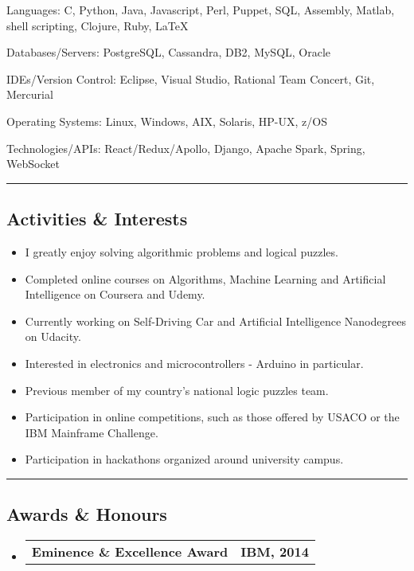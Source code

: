 \documentclass[10pt,letterpaper]{article}
\makeatletter
\newenvironment{indentsection}[1]%
{\begin{list}{}%
    {\setlength{\leftmargin}{#1}}%
    \item[]%
}
{\end{list}}
\newcommand{\headerrow}[2]
{\begin{tabular*}{\linewidth}{l@{\extracolsep{\fill}}r}
    #1 &
    #2 \\
\end{tabular*}}
\makeatother
\begin{document}
\begin{indentsection}{\parindent}
\begin{description*}
    \item[Languages:]
    C, Python, Java, Javascript, Perl, Puppet, SQL, Assembly, Matlab, shell scripting, Clojure, Ruby, \LaTeX
    \item[Databases/Servers:]
    PostgreSQL, Cassandra, DB2, MySQL, Oracle
    \item[IDEs/Version Control:]
    Eclipse, Visual Studio, Rational Team Concert, Git, Mercurial
    \item[Operating Systems:]
    Linux, Windows, AIX, Solaris, HP-UX, z/OS
    \item[Technologies/APIs:] React/Redux/Apollo, Django, Apache Spark, Spring, WebSocket

\end{description*}
\end{indentsection}

\hrule
\vspace{-0.4em}
\subsection*{Activities \& Interests}

\begin{itemize}
    \parskip=0.1em

    \item I greatly enjoy solving algorithmic problems and logical puzzles.
    \item Completed online courses on Algorithms, Machine Learning and Artificial Intelligence on Coursera and Udemy.
    \item Currently working on Self-Driving Car and Artificial Intelligence Nanodegrees on Udacity.
    \item Interested in electronics and microcontrollers - Arduino in particular.
    \item Previous member of my country's national logic puzzles team.
    \item Participation in online competitions, such as those offered by USACO or the IBM Mainframe Challenge.
    \item Participation in hackathons organized around university campus.

\end{itemize}

\hrule
\vspace{-0.4em}
\subsection*{Awards \& Honours}

\begin{itemize}
    \parskip=0.1em
    \item
    \headerrow
        {\textbf{Eminence \& Excellence Award}}
        {\textbf{IBM, 2014}}

\end{itemize}
\end{document}
